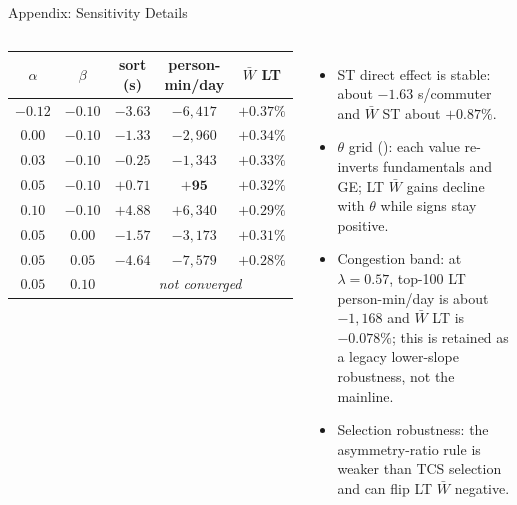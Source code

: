 \documentclass[11pt,aspectratio=169]{beamer}
\newcommand{\app}[1]{\allowbreak\hspace{0.25em}\hyperlink{#1}{\beamergotobutton{details}}}
\newcommand{\navback}[1]{\par\vspace{0.35em}\noindent\hfill\hyperlink{#1}{\beamerreturnbutton{back}}}
\begin{document}
\begin{frame}[label=appsensdetail]{Appendix: Sensitivity Details}
\scriptsize
\begin{columns}[T,onlytextwidth]
\begin{flushright}
\setlength{\tabcolsep}{1.0pt}
\begin{tabular}{ccccc}
\toprule
$\alpha$ & $\beta$ & sort (s) & person-min/day & $\bar W$ LT \\
\midrule
$-0.12$ & $-0.10$ & $-3.63$ & $-6{,}417$ & $+0.37\%$ \\
$0.00$ & $-0.10$ & $-1.33$ & $-2{,}960$ & $+0.34\%$ \\
$0.03$ & $-0.10$ & $-0.25$ & $-1{,}343$ & $+0.33\%$ \\
$\mathbf{0.05}$ & $\mathbf{-0.10}$ & $\mathbf{+0.71}$ & $\mathbf{+95}$ & $\mathbf{+0.32\%}$ \\
$0.10$ & $-0.10$ & $+4.88$ & $+6{,}340$ & $+0.29\%$ \\
$0.05$ & $0.00$ & $-1.57$ & $-3{,}173$ & $+0.31\%$ \\
$0.05$ & $0.05$ & $-4.64$ & $-7{,}579$ & $+0.28\%$ \\
$0.05$ & $0.10$ & \multicolumn{3}{c}{\emph{not converged}} \\
\bottomrule
\end{tabular}
\end{flushright}
\begin{itemize}\footnotesize
  \item ST direct effect is stable: about $-1.63$ s/commuter and $\bar W$ ST about $+0.87\%$.
  \item $\theta$ grid (\app{appsens_theta}): each value re-inverts fundamentals and GE; LT $\bar W$ gains decline with $\theta$ while signs stay positive.
  \item Congestion band: at $\lambda=0.57$, top-100 LT person-min/day is about $-1{,}168$ and $\bar W$ LT is $-0.078\%$; this is retained as a legacy lower-slope robustness, not the mainline.
  \item Selection robustness: the asymmetry-ratio rule is weaker than TCS selection and can flip LT $\bar W$ negative.
\end{itemize}
\end{columns}
\navback{appsens}
\end{frame}
\end{document}
